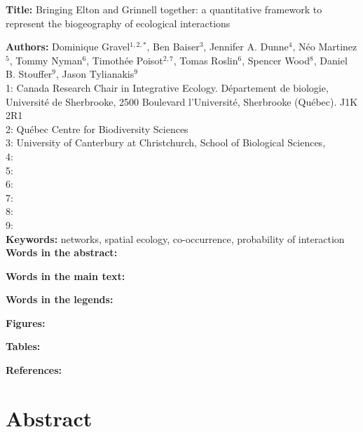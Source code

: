 \documentclass[12pt]{article}
\begin{document}
\linenumbers 
\modulolinenumbers[1]

\textbf{Title:} Bringing Elton and Grinnell together: a quantitative framework to represent the biogeography of ecological interactions

\textbf{Authors:} Dominique Gravel$^{1,2,*}$, Ben Baiser$^{3}$, Jennifer A. Dunne$^{4}$, N\'eo
Martinez$^{5}$, Tommy Nyman$^{6}$, Timoth\'ee Poisot$^{2,7}$, Tomas Roslin$^{6}$, Spencer Wood$^{8}$, Daniel B. Stouffer$^{9}$, Jason Tylianakis$^{9}$\\

1: Canada Research Chair in Integrative Ecology. D\'epartement de
biologie, Universit\'e de Sherbrooke,  2500 Boulevard l'Universit\'e, 
Sherbrooke (Québec).  J1K 2R1\\

2: Qu\'ebec Centre for Biodiversity Sciences\\

3: University of Canterbury at Christchurch, School of Biological Sciences,\\

4: \\

5: \\

6:\\

7:\\

8:\\

9:\\

\textbf{Keywords:} networks, spatial ecology, co-occurrence, probability of interaction\\

\textbf{Words in the abstract:} 

\textbf{Words in the main text:} 

\textbf{Words in the legends:}  

\textbf{Figures:} 

\textbf{Tables:}     

\textbf{References:} 

\newpage
\doublespacing

\section*{Abstract} 

\newpage
\end{document}
